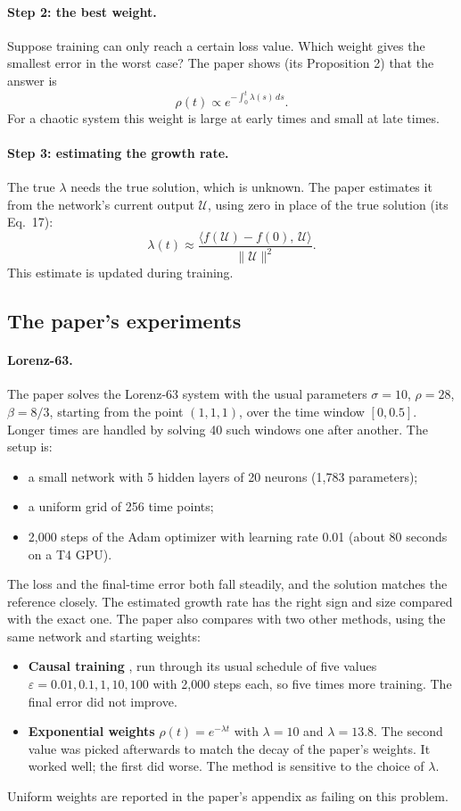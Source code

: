 \documentclass[11pt,a4paper]{article}
\begin{document}
\paragraph{Step 2: the best weight.} Suppose training can only reach a certain loss
value. Which weight gives the smallest error in the worst case? The paper shows (its
Proposition 2) that the answer is
\[
 \rho(t) \propto e^{-\int_0^t \lambda(s)\,ds}.
\]
For a chaotic system this weight is large at early times and small at late times.

\paragraph{Step 3: estimating the growth rate.} The true $\lambda$ needs the true solution,
which is unknown. The paper estimates it from the network's current output
$\mathcal U$, using zero in place of the true solution (its Eq.~17):
\[
 \lambda(t) \approx \frac{\langle f(\mathcal U)-f(0),\,\mathcal U\rangle}{\|\mathcal U\|^2}.
\]
This estimate is updated during training.

\subsection{The paper's experiments}
\paragraph{Lorenz-63.} The paper solves the Lorenz-63 system with the usual parameters
$\sigma=10$, $\rho=28$, $\beta=8/3$, starting from the point $(1,1,1)$, over the time
window $[0,0.5]$. Longer times are handled by solving 40 such windows one after another. The
setup is:
\begin{itemize}
\item a small network with 5 hidden layers of 20 neurons (1{,}783 parameters);
\item a uniform grid of 256 time points;
\item 2{,}000 steps of the Adam optimizer with learning rate 0.01 (about 80 seconds on a
  T4 GPU).
\end{itemize}
The loss and the final-time error both fall steadily, and the solution matches the
reference closely. The estimated growth rate has the right sign and size compared with the
exact one. The paper also compares with two other methods, using the same network and
starting weights:
\begin{itemize}
\item \textbf{Causal training} \cite{wang2022}, run through its usual schedule of five
  values $\varepsilon = 0.01, 0.1, 1, 10, 100$ with 2{,}000 steps each, so five times
  more training. The final error did not improve.
\item \textbf{Exponential weights} $\rho(t)=e^{-\lambda t}$ with $\lambda=10$ and
  $\lambda=13.8$. The second value was picked afterwards to match the decay of the paper's
  weights. It worked well; the first did worse. The method is sensitive to the choice of
  $\lambda$.
\end{itemize}
Uniform weights are reported in the paper's appendix as failing on this problem.
\end{document}
